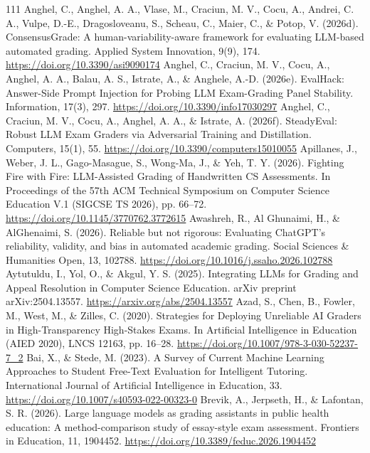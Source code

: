 \begin{thebibliography}{111}
 Anghel, C., Anghel, A. A., Vlase, M., Craciun, M. V., Cocu, A., Andrei, C. A., Vulpe, D.-E., Dragosloveanu, S., Scheau, C., Maier, C., \& Potop, V. (2026d). ConsensusGrade: A human-variability-aware framework for evaluating LLM-based automated grading. Applied System Innovation, 9(9), 174. \url{https://doi.org/10.3390/asi9090174}
 Anghel, C., Craciun, M. V., Cocu, A., Anghel, A. A., Balau, A. S., Istrate, A., \& Anghele, A.-D. (2026e). EvalHack: Answer-Side Prompt Injection for Probing LLM Exam-Grading Panel Stability. Information, 17(3), 297. \url{https://doi.org/10.3390/info17030297}
 Anghel, C., Craciun, M. V., Cocu, A., Anghel, A. A., \& Istrate, A. (2026f). SteadyEval: Robust LLM Exam Graders via Adversarial Training and Distillation. Computers, 15(1), 55. \url{https://doi.org/10.3390/computers15010055}
 Apillanes, J., Weber, J. L., Gago-Masague, S., Wong-Ma, J., \& Yeh, T. Y. (2026). Fighting Fire with Fire: LLM-Assisted Grading of Handwritten CS Assessments. In Proceedings of the 57th ACM Technical Symposium on Computer Science Education V.1 (SIGCSE TS 2026), pp. 66--72. \url{https://doi.org/10.1145/3770762.3772615}
 Awashreh, R., Al Ghunaimi, H., \& AlGhenaimi, S. (2026). Reliable but not rigorous: Evaluating ChatGPT's reliability, validity, and bias in automated academic grading. Social Sciences \& Humanities Open, 13, 102788. \url{https://doi.org/10.1016/j.ssaho.2026.102788}
 Aytutuldu, I., Yol, O., \& Akgul, Y. S. (2025). Integrating LLMs for Grading and Appeal Resolution in Computer Science Education. arXiv preprint arXiv:2504.13557. \url{https://arxiv.org/abs/2504.13557}
 Azad, S., Chen, B., Fowler, M., West, M., \& Zilles, C. (2020). Strategies for Deploying Unreliable AI Graders in High-Transparency High-Stakes Exams. In Artificial Intelligence in Education (AIED 2020), LNCS 12163, pp. 16--28. \url{https://doi.org/10.1007/978-3-030-52237-7_2}
 Bai, X., \& Stede, M. (2023). A Survey of Current Machine Learning Approaches to Student Free-Text Evaluation for Intelligent Tutoring. International Journal of Artificial Intelligence in Education, 33. \url{https://doi.org/10.1007/s40593-022-00323-0}
 Brevik, A., Jerpseth, H., \& Lafontan, S. R. (2026). Large language models as grading assistants in public health education: A method-comparison study of essay-style exam assessment. Frontiers in Education, 11, 1904452. \url{https://doi.org/10.3389/feduc.2026.1904452}

\end{thebibliography}
